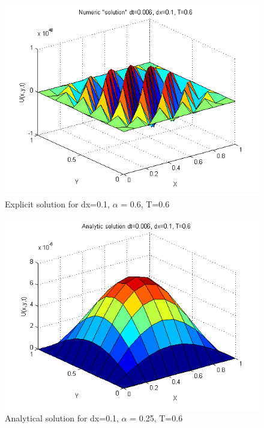 \documentclass[a4paper,10pt]{article}
\begin{document}
\begin{figure}
  \begin{center}
    \includegraphics[scale=0.5]{num_dt0006_dx01_T06}
    \caption{Explicit solution for dx=0.1, $\alpha$ = 0.6, T=0.6}
    \label{fig:Num_feil2}
  \end{center}

\end{figure}

\begin{figure}
  \begin{center}
    \includegraphics[scale=0.5]{ana_dt0006_dx01_T06}
    \caption{Analytical solution for dx=0.1, $\alpha$ = 0.25, T=0.6}
    \label{fig:Ana_feil2}
  \end{center}

\end{figure}
\end{document}
